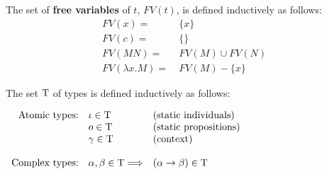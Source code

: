 

\begin{definition} The set of \textbf{free variables} of $t$, $FV(t)$, is defined inductively as follows:
\begin{align*}
FV(x) = \ &  \{ x \} \\
FV(c) = \ & \{ \} \\
FV(M N) = \ & FV(M) \cup FV(N)  \\
FV( \lambda x. M) = \ & FV(M) - \{ x \}
\end{align*}
\end{definition}

\begin{definition}[Types]
The set $\text{T}$ of types is defined inductively as follows:
\begin{center} $
\begin{array}{rll}
\text{Atomic types:} & \iota \in \text{T} & \text{(static individuals)} \\
 & o \in \text{T} &  \text{(static propositions)} \\
&  \gamma \in \text{T} &  \text{(context)} \\\\
 \text{Complex types:} & \alpha, \beta \in \text{T} \Longrightarrow & (\alpha \rightarrow \beta) \in \text{T} \\
\end{array} 
$ \end{center}
\label{def:types-FO}
\end{definition}


